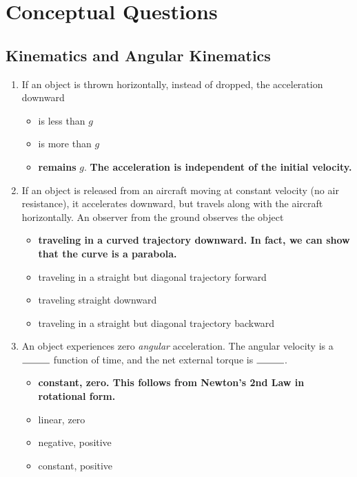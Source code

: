 \documentclass[10pt]{article}
\begin{document}
\maketitle

\section{Conceptual Questions}
\subsection{Kinematics and Angular Kinematics}
\begin{enumerate}
\item If an object is thrown horizontally, instead of dropped, the acceleration downward
\begin{itemize}
\item is less than $g$
\item is more than $g$
\item \textbf{remains} $g$.  \textbf{The acceleration is independent of the initial velocity.}
\end{itemize}
\item If an object is released from an aircraft moving at constant velocity (no air resistance), it accelerates downward, but travels along with the aircraft horizontally.  An observer from the ground observes the object
\begin{itemize}
\item \textbf{traveling in a curved trajectory downward.  In fact, we can show that the curve is a parabola.}
\item traveling in a straight but diagonal trajectory forward
\item traveling straight downward
\item traveling in a straight but diagonal trajectory backward
\end{itemize}
\item An object experiences zero \textit{angular} acceleration.  The angular velocity is a $\rule{1cm}{0.15mm}$ function of time, and the net external torque is $\rule{1cm}{0.15mm}$.
\begin{itemize}
\item \textbf{constant, zero. This follows from Newton's 2nd Law in rotational form.}
\item linear, zero
\item negative, positive 
\item constant, positive
\end{itemize}
\end{enumerate}
\end{document}

